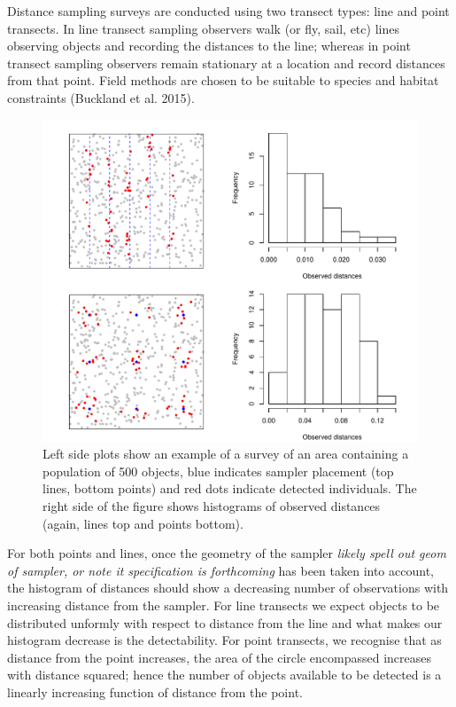 \documentclass[article]{jss}
\begin{document}
Distance sampling surveys are conducted using two transect types: line
and point transects. In line transect sampling observers walk (or fly,
sail, etc) lines observing objects and recording the distances to the
line; whereas in point transect sampling observers remain stationary at
a location and record distances from that point. Field methods are
chosen to be suitable to species and habitat constraints (Buckland et
al. 2015).

\begin{CodeChunk}
\begin{figure}

{\centering \includegraphics{paper_files/figure-latex/points-and-lines-1} 

}

\caption{Left side plots show an example of a survey of an area containing a population of 500 objects, blue indicates sampler placement (top lines, bottom points) and red dots indicate detected individuals. The right side of the figure shows histograms of observed distances (again, lines top and points bottom).\label{fig:pointslines}}\label{fig:points-and-lines}
\end{figure}
\end{CodeChunk}

For both points and lines, once the geometry of the sampler \emph{likely
spell out geom of sampler, or note it specification is forthcoming} has
been taken into account, the histogram of distances should show a
decreasing number of observations with increasing distance from the
sampler. For line transects we expect objects to be distributed unformly
with respect to distance from the line and what makes our histogram
decrease is the detectability. For point transects, we recognise that as
distance from the point increases, the area of the circle encompassed
increases with distance squared; hence the number of objects available
to be detected is a linearly increasing function of distance from the
point.
\end{document}
